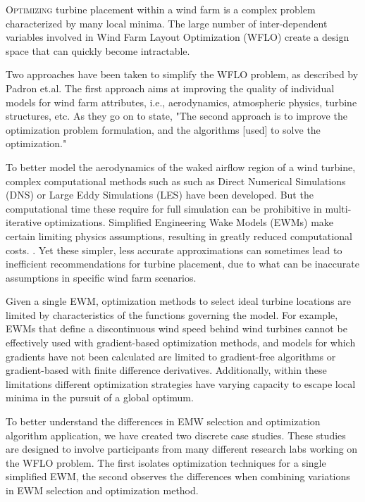 

    

\lettrine[nindent=0pt]{O}{ptimizing} turbine placement within a wind farm is a complex problem characterized by many local minima.
The large number of inter-dependent variables involved in Wind Farm Layout Optimization (WFLO) create a design space that can quickly become intractable.

Two approaches have been taken to simplify the WFLO problem, as described by Padron et.al.\cite{Padron2018} The first approach aims at improving the quality of individual models for wind farm attributes, i.e., aerodynamics, atmospheric physics, turbine structures, etc.
As they go on to state, "The second approach is to improve the optimization problem formulation, and the algorithms [used] to solve the optimization." \cite{Padron2018}

To better model the aerodynamics of the waked airflow region of a wind turbine, complex computational methods such as such as Direct Numerical Simulations (DNS) or Large Eddy Simulations (LES) have been developed.
But the computational time these require for full simulation can be prohibitive in multi-iterative optimizations.
Simplified Engineering Wake Models (EWMs) make certain limiting physics assumptions, resulting in greatly reduced computational costs. \cite{HerbertAcero2014}.
Yet these simpler, less accurate approximations can sometimes lead to inefficient recommendations for turbine placement, due to what can be inaccurate assumptions in specific wind farm scenarios. %

Given a single EWM, optimization methods to select ideal turbine locations are limited by characteristics of the functions governing the model.
%
For example, EWMs that define a discontinuous wind speed behind wind turbines cannot be effectively used with gradient-based optimization methods, and models for which gradients have not been calculated are limited to gradient-free algorithms or gradient-based with finite difference derivatives.
%
%
Additionally, within these limitations different optimization strategies have varying capacity to escape local minima in the pursuit of a global optimum. %

To better understand the differences in EMW selection and optimization algorithm application, we have created two discrete case studies.
These studies are designed to involve participants from many different research labs working on the WFLO problem.
The first isolates optimization techniques for a single simplified EWM, the second observes the differences when combining variations in EWM selection and optimization method.